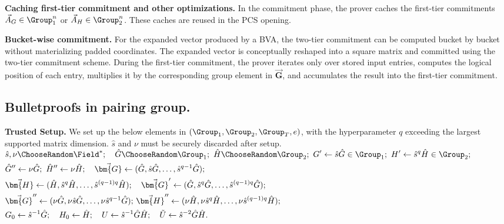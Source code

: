 \mysmallskip
{\bf Caching first-tier commitment and other optimizations.}
In the commitment phase, the prover caches the first-tier commitments $\vec{A}_G \in \Group_1^n$ or $\vec{A}_H \in \Group_2^n$.
These caches are reused in the PCS opening.

\mysmallskip
{\bf Bucket-wise commitment.}
For the expanded vector produced by a BVA, the two-tier commitment can be
computed bucket by bucket without materializing padded coordinates.  The
expanded vector is conceptually reshaped into a square matrix and committed
using the two-tier commitment scheme.  During the first-tier commitment, the
prover iterates only over stored input entries, computes the logical position of
each entry, multiplies it by the corresponding group element in $\vec{\bm{G}}$,
and accumulates the result into the first-tier commitment.

\subsection{Bulletproofs in pairing group.}
\mysmallskip
{\bf Trusted Setup.}
We set up the below elements in $(\Group_1, \Group_2, \Group_T, e)$,
with the hyperparameter $q$ exceeding the largest supported matrix dimension.
$\hat{s}$ and $\nu$ 
must be securely discarded after setup.
\(
\begin{aligned}
	&
	\hat{s}, \nu \ChooseRandom \Field^*; 
	\quad
	\hat{G} \ChooseRandom \Group_1;
	\,\,
	\hat{H} \ChooseRandom \Group_2;
	\,\,
	G' \leftarrow \hat{s}\hat{G} \in \Group_1;
	\,\,
	H' \leftarrow \hat{s}^q\hat{H} \in \Group_2;
	\\
 	& \hat{G}'' \leftarrow \nu \hat{G}; \,\, \hat{H}'' \leftarrow \nu \hat{H}; \quad
 	\vec{\bm{G}} \leftarrow (\hat{G}, \hat{s}\hat{G}, \ldots, \hat{s}^{q - 1}\hat{G});
	\\
 	&
 	\vec{\bm{H}} \leftarrow (\hat{H}, \hat{s}^q\hat{H}, \ldots, \hat{s}^{(q - 1)q}\hat{H}); \quad
	 \vec{\bm{G}}' \leftarrow (\hat{G}, \hat{s}^q\hat{G}, \ldots, \hat{s}^{(q - 1)q}\hat{G});
	\\
 	&
 	\vec{\bm{G}}'' \leftarrow (\nu \hat{G}, \nu \hat{s}\hat{G}, \ldots, \nu \hat{s}^{q - 1}\hat{G}); \,
 	\vec{\bm{H}}'' \leftarrow (\nu \hat{H}, \nu \hat{s}^q\hat{H}, \ldots, \nu \hat{s}^{(q - 1)q}\hat{H});
	\\
 	&
 	G_0 \leftarrow \hat{s}^{-1} \hat{G}; \quad H_0 \leftarrow \hat{H};\quad 
 	U \leftarrow \hat{s}^{-1} \hat{G} \hat{H}; \quad \tilde{U} \leftarrow \hat{s}^{-2} \hat{G} \hat{H}.
\end{aligned}
\)

